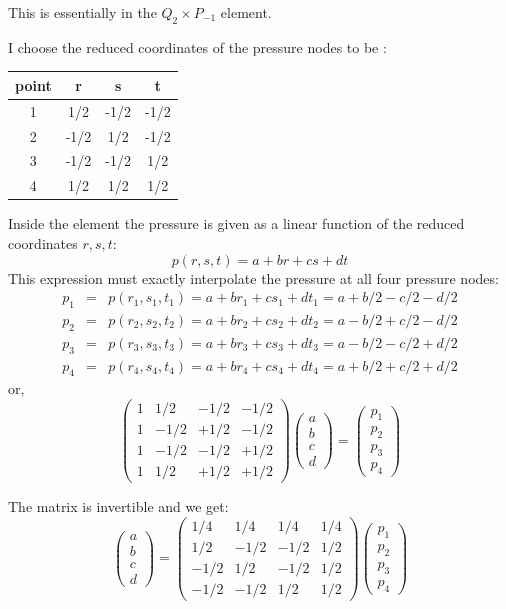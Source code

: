 This is essentially in the $Q_2\times P_{-1}$ element. 

I choose the reduced coordinates of the pressure nodes to be :

\begin{tabular}{cccc}
\hline
point & r & s & t \\
\hline
1& 1/2 &-1/2 &-1/2\\
2& -1/2 &1/2 &-1/2\\
3& -1/2 &-1/2& 1/2\\
4& 1/2 &1/2& 1/2 \\
\hline
\end{tabular}

Inside the element the pressure is given as a linear function of the reduced coordinates $r,s,t$:
\[
p(r,s,t)=a+br+cs+dt
\]
This expression must exactly interpolate the pressure at all four pressure nodes:
\begin{eqnarray}
p_1 
&=& p(r_1,s_1,t_1) 
= a+br_1+cs_1+dt_1 
= a+b/2-c/2-d/2\nonumber\\
p_2
&=& p(r_2,s_2,t_2)
= a+br_2+cs_2+dt_2
= a-b/2+c/2-d/2\nonumber\\
p_3
&=& p(r_3,s_3,t_3) 
= a+br_3+cs_3+dt_3 
= a-b/2-c/2+d/2\nonumber\\
p_4
&=& p(r_4,s_4,t_4) 
= a+br_4+cs_4+dt_4
= a+b/2+c/2+d/2\nonumber
\end{eqnarray}
or,
\begin{equation}
\left(
\begin{array}{cccc}
1 & 1/2 & -1/2 & -1/2 \\
1 & -1/2 & +1/2 & -1/2 \\
1 & -1/2 & -1/2 & +1/2 \\
1 & 1/2 & +1/2 & +1/2 
\end{array}
\right)
\left(
\begin{array}{c}
a\\b\\c\\d
\end{array}
\right)=
\left(
\begin{array}{c}
p_1\\p_2\\p_3\\p_4
\end{array}
\right)
\nonumber
\end{equation}

The matrix is invertible and we get:
\[
\left(
\begin{array}{c}
a\\b\\c\\d
\end{array}
\right)=
\left(
\begin{array}{cccc}
1/4 & 1/4 & 1/4 & 1/4 \\
1/2 & -1/2 & -1/2 & 1/2 \\
-1/2 & 1/2 & -1/2 & 1/2 \\
-1/2 & -1/2 & 1/2 & 1/2
\end{array}
\right)
\left(
\begin{array}{c}
p_1\\p_2\\p_3\\p_4
\end{array}
\right)
\]

